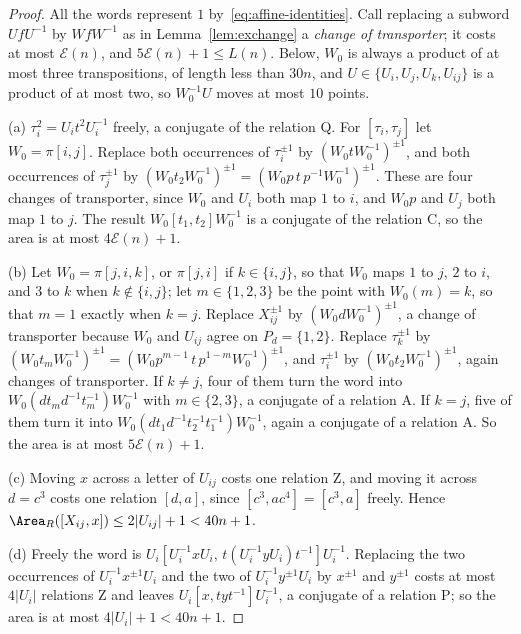 \begin{proof}
All the words represent $1$ by~\eqref{eq:affine-identities}. Call replacing a subword $UfU^{-1}$ by $WfW^{-1}$ as in Lemma~\ref{lem:exchange} a
\emph{change of transporter}; it costs at most $\mathcal E(n)$, and $5\mathcal E(n)+1\le L(n)$. Below, $W_0$ is always a product of at most three
transpositions, of length less than $30n$, and $U\in\{U_i,U_j,U_k,U_{ij}\}$ is a product of at most two, so $W_0^{-1}U$ moves at most $10$ points.

(a) $\tau_i^2=U_it^2U_i^{-1}$ freely, a conjugate of the relation \textsf{Q}. For $[\tau_i,\tau_j]$ let $W_0=\pi[i,j]$. Replace both occurrences
of $\tau_i^{\pm1}$ by $(W_0tW_0^{-1})^{\pm1}$, and both occurrences of $\tau_j^{\pm1}$ by $(W_0t_2W_0^{-1})^{\pm1}=(W_0p\,t\,p^{-1}W_0^{-1})^{\pm1}$.
These are four changes of transporter, since $W_0$ and $U_i$ both map $1$ to $i$, and $W_0p$ and $U_j$ both map $1$ to $j$. The result
$W_0[t_1,t_2]W_0^{-1}$ is a conjugate of the relation \textsf{C}, so the area is at most $4\mathcal E(n)+1$.

(b) Let $W_0=\pi[j,i,k]$, or $\pi[j,i]$ if $k\in\{i,j\}$, so that $W_0$ maps $1$ to $j$, $2$ to $i$, and $3$ to $k$ when $k\notin\{i,j\}$; let
$m\in\{1,2,3\}$ be the point with $W_0(m)=k$, so that $m=1$ exactly when $k=j$. Replace $X_{ij}^{\pm1}$ by $(W_0dW_0^{-1})^{\pm1}$, a change of
transporter because $W_0$ and $U_{ij}$ agree on $P_d=\{1,2\}$. Replace $\tau_k^{\pm1}$ by $(W_0t_mW_0^{-1})^{\pm1}=(W_0p^{m-1}\,t\,p^{1-m}W_0^{-1})^{\pm1}$,
and $\tau_i^{\pm1}$ by $(W_0t_2W_0^{-1})^{\pm1}$, again changes of transporter. If $k\ne j$, four of them turn the word into
$W_0(dt_md^{-1}t_m^{-1})W_0^{-1}$ with $m\in\{2,3\}$, a conjugate of a relation \textsf{A}. If $k=j$, five of them turn it into
$W_0(dt_1d^{-1}t_2^{-1}t_1^{-1})W_0^{-1}$, again a conjugate of a relation \textsf{A}. So the area is at most $5\mathcal E(n)+1$.

(c) Moving $x$ across a letter of $U_{ij}$ costs one relation \textsf{Z}, and moving it across $d=c^3$ costs one relation $[d,a]$, since
$[c^3,ac^4]=[c^3,a]$ freely. Hence $\Area_R([X_{ij},x])\le2|U_{ij}|+1<40n+1$.

(d) Freely the word is $U_i[U_i^{-1}xU_i,\,t(U_i^{-1}yU_i)t^{-1}]U_i^{-1}$. Replacing the two occurrences of $U_i^{-1}x^{\pm1}U_i$ and the two of
$U_i^{-1}y^{\pm1}U_i$ by $x^{\pm1}$ and $y^{\pm1}$ costs at most $4|U_i|$ relations \textsf{Z} and leaves $U_i[x,tyt^{-1}]U_i^{-1}$, a conjugate of a
relation \textsf{P}; so the area is at most $4|U_i|+1<40n+1$.
\end{proof}

